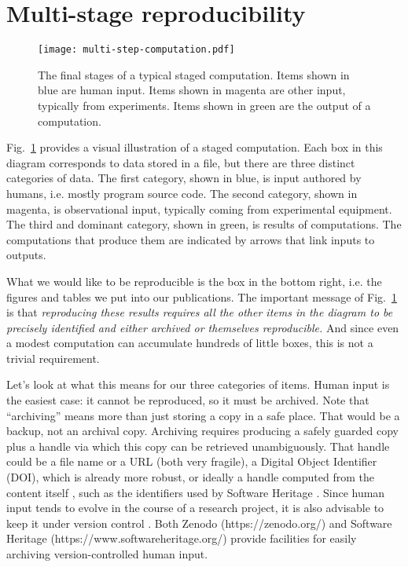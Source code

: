 \documentclass[10pt,journal,compsoc]{IEEEtran}
\begin{document}
\section{Multi-stage reproducibility}

\begin{figure}[tbh]
\centering
\texttt{[image: multi-step-computation.pdf]}
\caption{The final stages of a typical staged computation. Items shown in blue are human input. Items shown in magenta are other input, typically from experiments. Items shown in green are the output of a computation.}
\label{fig:staged-computation}
\end{figure}

Fig.~\ref{fig:staged-computation} provides a visual illustration of a staged computation. Each box in this diagram corresponds to data stored in a file, but there are three distinct categories of data. The first category, shown in blue, is input authored by humans, i.e. mostly program source code. The second category, shown in magenta, is observational input, typically coming from experimental equipment. The third and dominant category, shown in green, is results of computations. The computations that produce them are indicated by arrows that link inputs to outputs.

What we would like to be reproducible is the box in the bottom right, i.e. the figures and tables we put into our publications. The important message of Fig.~\ref{fig:staged-computation} is that \textit{reproducing these results requires all the other items in the diagram to be precisely identified and either archived or themselves reproducible.} And since even a modest computation can accumulate hundreds of little boxes, this is not a trivial requirement.

Let's look at what this means for our three categories of items. Human input is the easiest case: it cannot be reproduced, so it must be archived. Note that ``archiving'' means more than just storing a copy in a safe place. That would be a backup, not an archival copy. Archiving requires producing a safely guarded copy plus a handle via which this copy can be retrieved unambiguously. That handle could be a file name or a URL (both very fragile), a Digital Object Identifier (DOI), which is already more robust, or ideally a handle computed from the content itself \cite{content-addressable}, such as the identifiers used by Software Heritage \cite{SWHid}. Since human input tends to evolve in the course of a research project, it is also advisable to keep it under version control \cite{version-control}. Both  Zenodo (https://zenodo.org/) and Software Heritage (https://www.softwareheritage.org/) provide facilities for easily archiving version-controlled human input.
\end{document}
